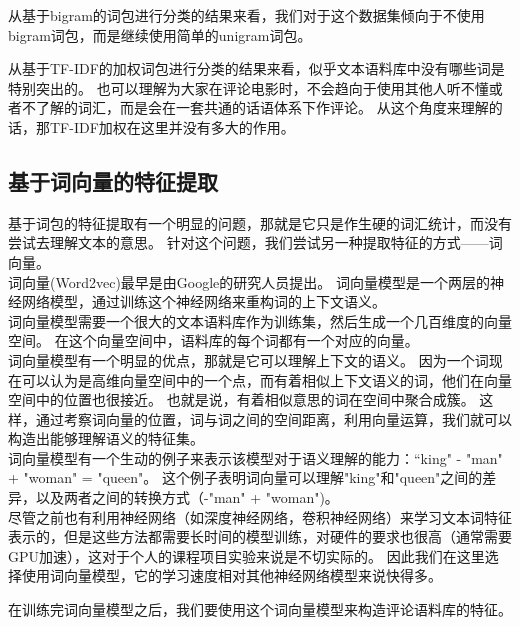 

从基于bigram的词包进行分类的结果来看，我们对于这个数据集倾向于不使用bigram词包，而是继续使用简单的unigram词包。



从基于TF-IDF的加权词包进行分类的结果来看，似乎文本语料库中没有哪些词是特别突出的。
也可以理解为大家在评论电影时，不会趋向于使用其他人听不懂或者不了解的词汇，而是会在一套共通的话语体系下作评论。
从这个角度来理解的话，那TF-IDF加权在这里并没有多大的作用。

\subsection{基于词向量的特征提取}
基于词包的特征提取有一个明显的问题，那就是它只是作生硬的词汇统计，而没有尝试去理解文本的意思。
针对这个问题，我们尝试另一种提取特征的方式——词向量。\\
词向量(Word2vec)最早是由Google的研究人员提出。
词向量模型是一个两层的神经网络模型，通过训练这个神经网络来重构词的上下文语义。\\
词向量模型需要一个很大的文本语料库作为训练集，然后生成一个几百维度的向量空间。
在这个向量空间中，语料库的每个词都有一个对应的向量。\\
 词向量模型有一个明显的优点，那就是它可以理解上下文的语义。
 因为一个词现在可以认为是高维向量空间中的一个点，而有着相似上下文语义的词，他们在向量空间中的位置也很接近。
 也就是说，有着相似意思的词在空间中聚合成簇。
 这样，通过考察词向量的位置，词与词之间的空间距离，利用向量运算，我们就可以构造出能够理解语义的特征集。\\
 词向量模型有一个生动的例子来表示该模型对于语义理解的能力：“king" - "man" + "woman" = "queen"。
 这个例子表明词向量可以理解"king"和"queen"之间的差异，以及两者之间的转换方式（-"man" + "woman")。\\
 尽管之前也有利用神经网络（如深度神经网络，卷积神经网络）来学习文本词特征表示的，但是这些方法都需要长时间的模型训练，对硬件的要求也很高（通常需要GPU加速），这对于个人的课程项目实验来说是不切实际的。
 因此我们在这里选择使用词向量模型，它的学习速度相对其他神经网络模型来说快得多。
 
 
 
 
 
 在训练完词向量模型之后，我们要使用这个词向量模型来构造评论语料库的特征。
 
 